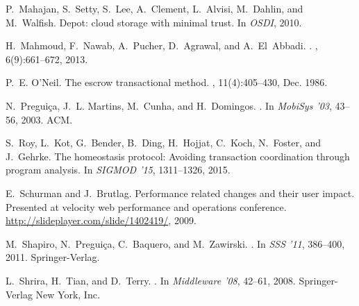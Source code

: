 \documentclass[11pt]{article}
\begin{document}
\begin{thebibliography}{10}
\begin{small}
P.~Mahajan, S.~Setty, S.~Lee, A.~Clement, L.~Alvisi, M.~Dahlin, and M.~Walfish.
\newblock Depot: cloud storage with minimal trust.
\newblock In {\em OSDI}, 2010.

H.~Mahmoud, F.~Nawab, A.~Pucher, D.~Agrawal, and A.~El~Abbadi.
.
, 6(9):661--672, 2013.

P.~E. O'Neil.
\newblock The escrow transactional method.
, 11(4):405--430, Dec. 1986.

N.~Pregui\c{c}a, J.~L. Martins, M.~Cunha, and H.~Domingos.
.
\newblock In {\em MobiSys '03}, 43--56, 2003. ACM.

S.~Roy, L.~Kot, G.~Bender, B.~Ding, H.~Hojjat, C.~Koch, N.~Foster, and
  J.~Gehrke.
\newblock The homeostasis protocol: Avoiding transaction coordination through
  program analysis.
\newblock In {\em SIGMOD '15}, 1311--1326, 2015.

E.~Schurman and J.~Brutlag.
\newblock Performance related changes and their user impact. {P}resented at
  velocity web performance and operations conference.
\newblock \url{http://slideplayer.com/slide/1402419/}, 2009.

M.~Shapiro, N.~Pregui\c{c}a, C.~Baquero, and M.~Zawirski.
.
\newblock In {\em SSS '11}, 386--400, 2011. Springer-Verlag.
  

L.~Shrira, H.~Tian, and D.~Terry.
.
\newblock In {\em Middleware '08}, 42--61, 2008. Springer-Verlag New
  York, Inc.


\end{small}
\end{thebibliography}
\end{document}
